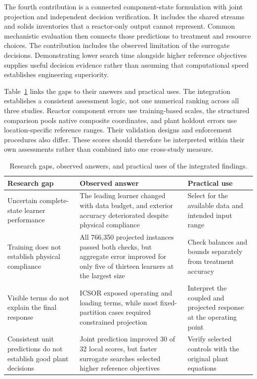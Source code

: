 The fourth contribution is a connected component-state formulation with joint projection and independent decision verification. It includes the shared streams and solids inventories that a reactor-only output cannot represent. Common mechanistic evaluation then connects those predictions to treatment and resource choices. The contribution includes the observed limitation of the surrogate decisions. Demonstrating lower search time alongside higher reference objectives supplies useful decision evidence rather than assuming that computational speed establishes engineering superiority.

Table~\ref{tab:integrated_observed_findings} links the gaps to their answers and practical uses. The integration establishes a consistent assessment logic, not one numerical ranking across all three studies. Reactor component errors use training-based scales, the structured comparison pools native composite coordinates, and plant holdout errors use location-specific reference ranges. Their validation designs and enforcement procedures also differ. These scores should therefore be interpreted within their own assessments rather than combined into one cross-study measure.

\begin{table}[htbp]
\centering\small
\caption{Research gaps, observed answers, and practical uses of the integrated findings.}
\label{tab:integrated_observed_findings}
\begin{tabular}{>{\raggedright\arraybackslash}p{}>{\raggedright\arraybackslash}p{}>{\raggedright\arraybackslash}p{}}
\toprule
Research gap & Observed answer & Practical use\\
\midrule
Uncertain complete-state learner performance & The leading learner changed with data budget, and exterior accuracy deteriorated despite physical compliance & Select for the available data and intended input range\\
Training does not establish physical compliance & All 766,350 projected instances passed both checks, but aggregate error improved for only five of thirteen learners at the largest size & Check balances and bounds separately from treatment accuracy\\
Visible terms do not explain the final response & ICSOR exposed operating and loading terms, while most fixed-partition cases required constrained projection & Interpret the coupled and projected response at the operating point\\
Consistent unit predictions do not establish good plant decisions & Joint prediction improved 30 of 32 local scores, but faster surrogate searches selected higher reference objectives & Verify selected controls with the original plant equations\\
\bottomrule
\end{tabular}
\end{table}

